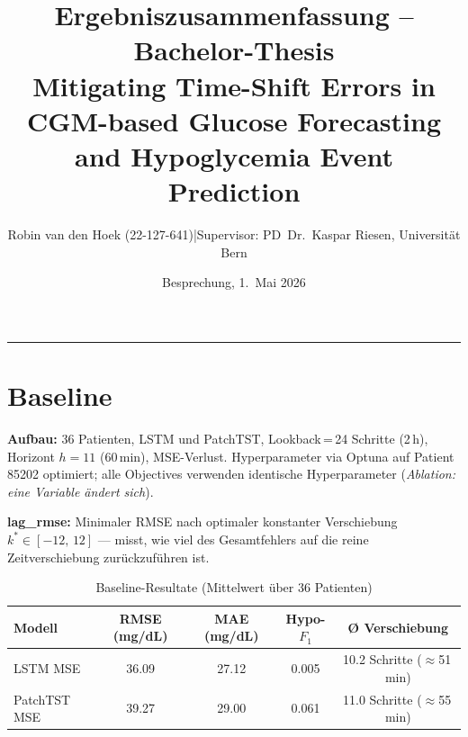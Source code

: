 \documentclass[a4paper,10pt]{article}
\title{\textbf{Ergebniszusammenfassung -- Bachelor-Thesis}\\[0.2em]
{\normalsize Mitigating Time-Shift Errors in CGM-based Glucose Forecasting\\
and Hypoglycemia Event Prediction}}
\author{Robin van den Hoek (22-127-641)\quad|\quad Supervisor: PD~Dr.\ Kaspar Riesen, Universität Bern}
\date{Besprechung, 1.\ Mai 2026}
\begin{document}
\maketitle
\vspace{-1em}
\hrule
\vspace{0.4em}

\section{Baseline}

\textbf{Aufbau:} 36 Patienten, LSTM und PatchTST, Lookback\,=\,24 Schritte (2\,h), Horizont $h{=}11$ (60\,min), MSE-Verlust. Hyperparameter via Optuna auf Patient 85202 optimiert; alle Objectives verwenden identische Hyperparameter (\emph{Ablation: eine Variable ändert sich}).

\textbf{lag\_rmse:} Minimaler RMSE nach optimaler konstanter Verschiebung $k^* \in [-12,\,12]$ --- misst, wie viel des Gesamtfehlers auf die reine Zeitverschiebung zurückzuführen ist.

\begin{table}[h!]
\centering
\caption{Baseline-Resultate (Mittelwert über 36 Patienten)}
\begin{tabular}{lcccc}
\toprule
Modell & RMSE (mg/dL) & MAE (mg/dL) & Hypo-$F_1$ & Ø Verschiebung \\
\midrule
LSTM MSE     & 36.09 & 27.12 & 0.005 & 10.2 Schritte ($\approx$51\,min) \\
PatchTST MSE & 39.27 & 29.00 & 0.061 & 11.0 Schritte ($\approx$55\,min) \\
\bottomrule
\end{tabular}
\end{table}

\vspace{-0.5em}
\end{document}
